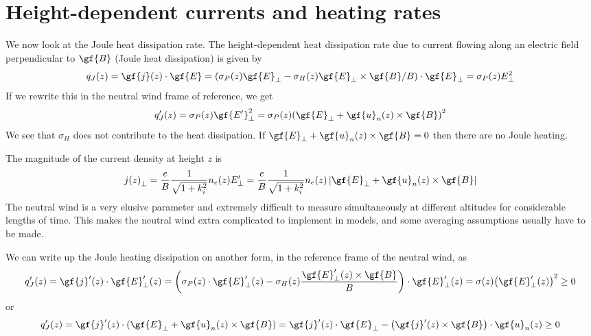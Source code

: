 \section{Height-dependent currents and heating rates}
We now look at the Joule heat dissipation rate. The height-dependent heat dissipation rate due to current flowing along an electric field perpendicular to \(\gf{B}\) (Joule heat dissipation) is given by
\begin{equation*}
    q_J(z)=\gf{j}(z)\cdot\gf{E}=(\sigma_P(z)\gf{E}_\perp-\sigma_H(z)\gf{E}_\perp\times\gf{B}/B)\cdot\gf{E}_\perp=\sigma_P(z)E_\perp^2
\end{equation*}
If we rewrite this in the neutral wind frame of reference, we get
\begin{equation*}
    q_J'(z)=\sigma_P(z)\gf{E'}_\perp^2=\sigma_P(z){\left(\gf{E}_\perp+\gf{u}_n(z)\times\gf{B}\right)}^2
\end{equation*}
We see that \(\sigma_H\) does not contribute to the heat dissipation. If \(\gf{E}_\perp+\gf{u}_n(z)\times\gf{B}=0\) then there are no Joule heating.

The magnitude of the current density at height \(z\) is
\begin{equation*}
    j{(z)}_\perp=\frac{e}{B}\frac{1}{\sqrt{1+k_i^2}}n_e(z)E_\perp'=\frac{e}{B}\frac{1}{\sqrt{1+k_i^2}}n_e(z)\left|\gf{E}_\perp+\gf{u}_n(z)\times\gf{B}\right|
\end{equation*}
The neutral wind is a very elusive parameter and extremely difficult to measure simultaneously at different altitudes for considerable lengths of time. This makes the neutral wind extra complicated to implement in models, and some averaging assumptions usually have to be made.

We can write up the Joule heating dissipation on another form, in the reference frame of the neutral wind, as
\begin{equation*}
    q_J'(z)=\gf{j}'(z)\cdot\gf{E}_\perp'(z)=\left(\sigma_P(z)\cdot\gf{E}_\perp'(z)-\sigma_H(z)\frac{\gf{E}_\perp'(z)\times\gf{B}}{B}\right)\cdot\gf{E}_\perp'(z)=\sigma(z){\left(\gf{E}_\perp'(z)\right)}^2\geq 0
\end{equation*}
or
\begin{equation*}
    q_J'(z)=\gf{j}'(z)\cdot\left(\gf{E}_\perp+\gf{u}_n(z)\times\gf{B}\right)=\gf{j}'(z)\cdot\gf{E}_\perp-\left(\gf{j}'(z)\times\gf{B}\right)\cdot\gf{u}_n(z)\geq 0
\end{equation*}

